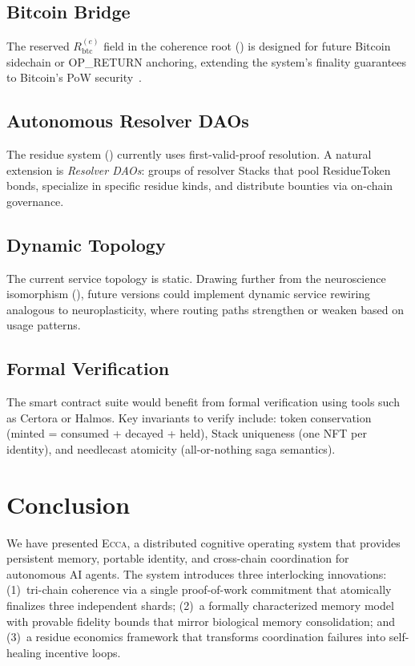 \documentclass[11pt,twocolumn]{article}
\theoremstyle{definition}
\theoremstyle{plain}
\theoremstyle{remark}
\newcommand{\ecca}{\textsc{Ecca}}
\begin{document}
\subsection{Bitcoin Bridge}

The reserved $R_{\mathrm{btc}}^{(e)}$ field in the coherence root () is designed for future Bitcoin sidechain or OP\_RETURN anchoring, extending the system's finality guarantees to Bitcoin's PoW security~\cite{nakamoto2008bitcoin}.

\subsection{Autonomous Resolver DAOs}

The residue system () currently uses first-valid-proof resolution. A natural extension is \emph{Resolver DAOs}: groups of resolver Stacks that pool ResidueToken bonds, specialize in specific residue kinds, and distribute bounties via on-chain governance.

\subsection{Dynamic Topology}

The current service topology is static. Drawing further from the neuroscience isomorphism (), future versions could implement dynamic service rewiring analogous to neuroplasticity, where routing paths strengthen or weaken based on usage patterns.

\subsection{Formal Verification}

The smart contract suite would benefit from formal verification using tools such as Certora or Halmos. Key invariants to verify include: token conservation (minted = consumed + decayed + held), Stack uniqueness (one NFT per identity), and needlecast atomicity (all-or-nothing saga semantics).

\section{Conclusion}\label{sec:conclusion}

We have presented \ecca{}, a distributed cognitive operating system that provides persistent memory, portable identity, and cross-chain coordination for autonomous AI agents. The system introduces three interlocking innovations: (1)~tri-chain coherence via a single proof-of-work commitment that atomically finalizes three independent shards; (2)~a formally characterized memory model with provable fidelity bounds that mirror biological memory consolidation; and (3)~a residue economics framework that transforms coordination failures into self-healing incentive loops.
\end{document}
